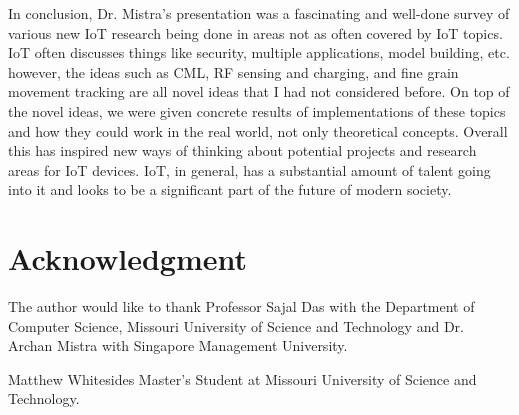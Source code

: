 \documentclass[journal,onecolumn]{IEEEtran}
\begin{document}
In conclusion, Dr. Mistra's presentation was a fascinating and well-done survey of various new IoT research being done in areas not as often covered by IoT topics. IoT often discusses things like security, multiple applications, model building, etc. however, the ideas such as CML, RF sensing and charging, and fine grain movement tracking are all novel ideas that I had not considered before. On top of the novel ideas, we were given concrete results of implementations of these topics and how they could work in the real world, not only theoretical concepts. Overall this has inspired new ways of thinking about potential projects and research areas for IoT devices. IoT, in general, has a substantial amount of talent going into it and looks to be a significant part of the future of modern society. 




\section*{Acknowledgment}
The author would like to thank Professor Sajal Das with the Department of Computer Science, Missouri University of Science and Technology and Dr. Archan Mistra with Singapore Management University.

\ifCLASSOPTIONcaptionsoff
  \newpage
\fi




\begin{IEEEbiographynophoto}{Matthew Whitesides}
  Master's Student at Missouri University of Science and Technology.
\end{IEEEbiographynophoto}

\end{document}
